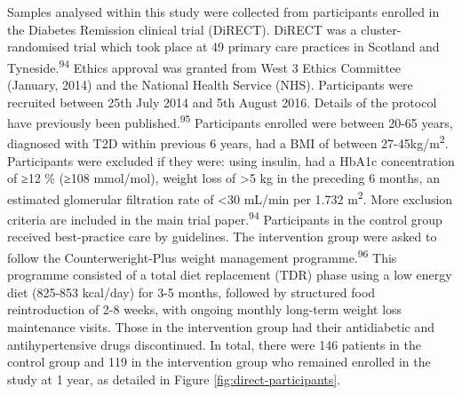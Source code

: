 \documentclass[11pt,twoside]{bristolthesis}
\begin{document}
Samples analysed within this study were collected from participants enrolled in the Diabetes Remission clinical trial (DiRECT). DiRECT was a cluster-randomised trial which took place at 49 primary care practices in Scotland and Tyneside.\textsuperscript{94} Ethics approval was granted from West 3 Ethics Committee (January, 2014) and the National Health Service (NHS). Participants were recruited between 25th July 2014 and 5th August 2016. Details of the protocol have previously been published.\textsuperscript{95} Participants enrolled were between 20-65 years, diagnosed with T2D within previous 6 years, had a BMI of between 27-45kg/m\textsuperscript{2}. Participants were excluded if they were: using insulin, had a HbA1c concentration of ≥12 \% (≥108 mmol/mol), weight loss of \textgreater5 kg in the preceding 6 months, an estimated glomerular filtration rate of \textless30 mL/min per 1.732 m\textsuperscript{2}. More exclusion criteria are included in the main trial paper.\textsuperscript{94} Participants in the control group received best-practice care by guidelines. The intervention group were asked to follow the Counterweright-Plus weight management programme.\textsuperscript{96} This programme consisted of a total diet replacement (TDR) phase using a low energy diet (825-853 kcal/day) for 3-5 months, followed by structured food reintroduction of 2-8 weeks, with ongoing monthly long-term weight loss maintenance visits. Those in the intervention group had their antidiabetic and antihypertensive drugs discontinued. In total, there were 146 patients in the control group and 119 in the intervention group who remained enrolled in the study at 1 year, as detailed in Figure \ref{fig:direct-participants}.
\end{document}
